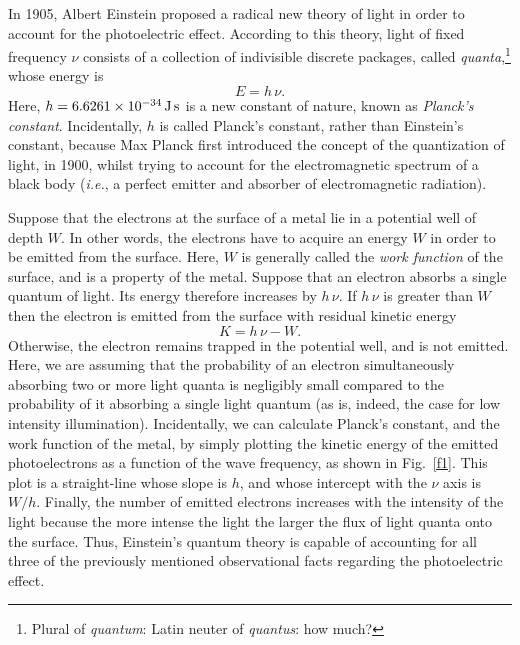 In 1905, Albert Einstein proposed a radical new theory of light in order to
account for the photoelectric effect. According to this  theory, light
of  fixed frequency $\nu$ consists of a collection of indivisible discrete packages, called
{\em quanta},\footnote{Plural of {\em quantum}: Latin neuter
of {\em quantus}\/: how much?} whose energy is
\begin{equation}\label{ee3.15}
E = h\,\nu.
\end{equation}
Here, $h = 6.6261\times 10^{-34}\,{\rm J\,s}$ is a new constant of nature,
known as {\em Planck's constant}. Incidentally, $h$ is called Planck's constant, rather than Einstein's constant, because Max Planck first introduced the concept of the quantization of light, in 1900, whilst trying
to account for the  electromagnetic spectrum of a black body ({\em i.e.},
a perfect emitter and absorber of electromagnetic radiation).

Suppose that the electrons at the surface of a metal lie in a potential well
of depth $W$. In other words, the electrons have to acquire an energy $W$
in order to be emitted from the surface. Here, $W$ is generally called
the {\em work function}\/ of the surface, and is a property of the
metal. Suppose that an electron absorbs a single quantum of light. Its energy
therefore increases by $h\,\nu$. If $h\,\nu$ is greater than $W$ then the
electron is emitted from the surface with residual kinetic energy
\begin{equation}
K = h\,\nu - W.
\end{equation}
Otherwise, the electron remains trapped in the potential well, and is not emitted. Here, we are assuming that the probability of an electron simultaneously absorbing
two or more light quanta is negligibly small compared to the probability of it 
absorbing a single light quantum (as is, indeed, the case for
low intensity illumination). Incidentally, we can calculate Planck's
constant, and the work function of the metal, by simply plotting the kinetic
energy of the emitted photoelectrons as a function of the wave frequency,
as shown in Fig.~\ref{f1}. This plot is a straight-line whose slope is $h$,
and whose intercept with the $\nu$ axis is $W/h$. Finally, the number
of emitted electrons increases with the intensity of the light because the
more intense the light the larger the flux of light quanta onto the surface.
Thus, Einstein's quantum theory is capable of accounting for all
three of the previously mentioned observational facts regarding the photoelectric
effect. 

